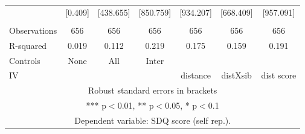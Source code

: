\begin{tabular}{lcccccc}
 & [0.409] & [438.655] & [850.759] & [934.207] & [668.409] & [957.091] \\
 &  &  &  &  &  &  \\
Observations & 656 & 656 & 656 & 656 & 656 & 656 \\
R-squared & 0.019 & 0.112 & 0.219 & 0.175 & 0.159 & 0.191 \\
Controls & None & All & Inter &  &  &  \\
 IV &  &  &  & distance & distXsib & dist score \\ \hline
\multicolumn{7}{c}{ Robust standard errors in brackets} \\
\multicolumn{7}{c}{ *** p$<$0.01, ** p$<$0.05, * p$<$0.1} \\
\multicolumn{7}{c}{ Dependent variable: SDQ score (self rep.).} \\
\end{tabular}
